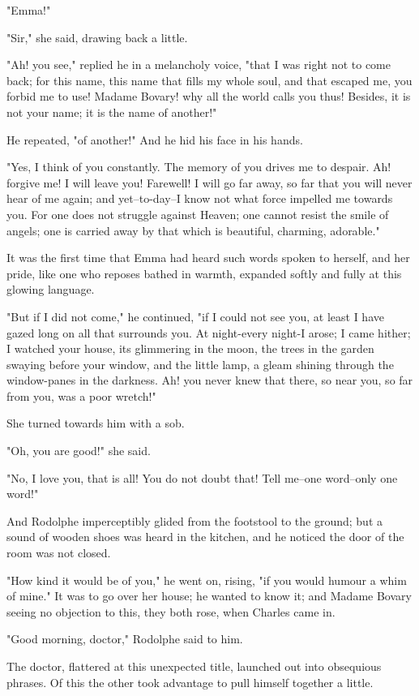 \documentclass{tufte-book}
\begin{document}
"Emma!"

"Sir," she said, drawing back a little.

"Ah! you see," replied he in a melancholy voice, "that I was right not
to come back; for this name, this name that fills my whole soul, and
that escaped me, you forbid me to use! Madame Bovary! why all the
world calls you thus! Besides, it is not your name; it is the name of
another!"

He repeated, "of another!" And he hid his face in his hands.

"Yes, I think of you constantly. The memory of you drives me to despair.
Ah! forgive me! I will leave you! Farewell! I will go far away, so far
that you will never hear of me again; and yet--to-day--I know not what
force impelled me towards you. For one does not struggle against Heaven;
one cannot resist the smile of angels; one is carried away by that which
is beautiful, charming, adorable."

It was the first time that Emma had heard such words spoken to herself,
and her pride, like one who reposes bathed in warmth, expanded softly
and fully at this glowing language.

"But if I did not come," he continued, "if I could not see you, at least
I have gazed long on all that surrounds you. At night-every night-I
arose; I came hither; I watched your house, its glimmering in the moon,
the trees in the garden swaying before your window, and the little lamp,
a gleam shining through the window-panes in the darkness. Ah! you never
knew that there, so near you, so far from you, was a poor wretch!"

She turned towards him with a sob.

"Oh, you are good!" she said.

"No, I love you, that is all! You do not doubt that! Tell me--one
word--only one word!"

And Rodolphe imperceptibly glided from the footstool to the ground; but
a sound of wooden shoes was heard in the kitchen, and he noticed the
door of the room was not closed.

"How kind it would be of you," he went on, rising, "if you would humour
a whim of mine." It was to go over her house; he wanted to know it; and
Madame Bovary seeing no objection to this, they both rose, when Charles
came in.

"Good morning, doctor," Rodolphe said to him.

The doctor, flattered at this unexpected title, launched out into
obsequious phrases. Of this the other took advantage to pull himself
together a little.
\end{document}
